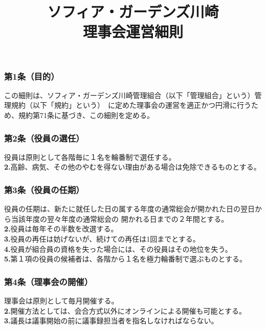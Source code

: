 \documentclass[12pt,uplatex]{jsarticle}
\title{ソフィア・ガーデンズ川崎 \\  理事会運営細則}
\begin{document}
\maketitle
\tableofcontents
\clearpage
\addtocounter{page}{-1}
\pagestyle{plain}

\subsubsection*{ 第1条（目的）}
この細則は、ソフィア・ガーデンズ川崎管理組合（以下「管理組合」という）管理規約（以下「規約」という）\
に定めた理事会の運営を適正かつ円滑に行うため、規約第71条に基づき、この細則を定める。

\subsubsection*{ 第2条（役員の選任）}
役員は原則として各階毎に１名を輪番制で選任する。\\
\textbf{2.}高齢、病気、その他のやむを得ない理由がある場合は免除できるものとする。\\

\subsubsection*{ 第3条（役員の任期）}
役員の任期は、新たに就任した日の属する年度の通常総会が開かれた日の翌日から当該年度の翌々年度の通常総会の
開かれる日までの２年間とする。\\
\textbf{2.}役員は毎年その半数を改選する。\\
\textbf{3.}役員の再任は妨げないが、続けての再任は1回までとする。\\
\textbf{4.}役員が組合員の資格を失った場合には、その役員はその地位を失う。\\
\textbf{5.}第１項の役員の候補者は、各階から１名を極力輪番制で選ぶものとする。\\

\subsubsection*{ 第4条（理事会の開催）}
理事会は原則として毎月開催する。\\
\textbf{2.}開催方法としては、会合方式以外にオンラインによる開催も可能とする。\\
\textbf{3.}議長は議事開始の前に議事録担当者を指名しなければならない。\\
\end{document}
